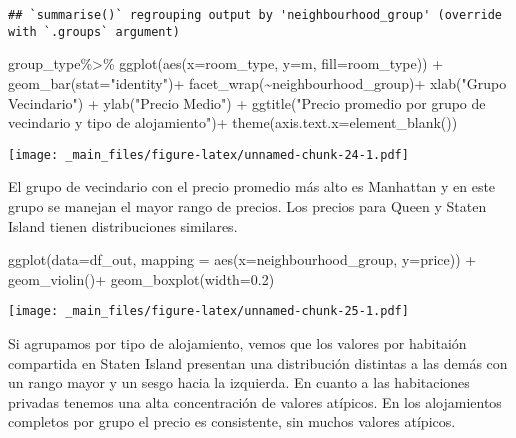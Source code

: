 \documentclass[
]{book}
\newenvironment{Shaded}{\begin{snugshade}}{\end{snugshade}}
\newcommand{\AttributeTok}[1]{\textcolor[rgb]{0.77,0.63,0.00}{#1}}
\newcommand{\FloatTok}[1]{\textcolor[rgb]{0.00,0.00,0.81}{#1}}
\newcommand{\FunctionTok}[1]{\textcolor[rgb]{0.00,0.00,0.00}{#1}}
\newcommand{\NormalTok}[1]{#1}
\newcommand{\SpecialCharTok}[1]{\textcolor[rgb]{0.00,0.00,0.00}{#1}}
\newcommand{\StringTok}[1]{\textcolor[rgb]{0.31,0.60,0.02}{#1}}
\begin{document}
\begin{verbatim}
## `summarise()` regrouping output by 'neighbourhood_group' (override with `.groups` argument)
\end{verbatim}

\begin{Shaded}
\begin{Highlighting}[]
\NormalTok{group\_type}\SpecialCharTok{\%\textgreater{}\%}
  \FunctionTok{ggplot}\NormalTok{(}\FunctionTok{aes}\NormalTok{(}\AttributeTok{x=}\NormalTok{room\_type, }\AttributeTok{y=}\NormalTok{m, }\AttributeTok{fill=}\NormalTok{room\_type)) }\SpecialCharTok{+} 
  \FunctionTok{geom\_bar}\NormalTok{(}\AttributeTok{stat=}\StringTok{"identity"}\NormalTok{)}\SpecialCharTok{+}
  \FunctionTok{facet\_wrap}\NormalTok{(}\SpecialCharTok{\textasciitilde{}}\NormalTok{neighbourhood\_group)}\SpecialCharTok{+}
  \FunctionTok{xlab}\NormalTok{(}\StringTok{"Grupo Vecindario"}\NormalTok{) }\SpecialCharTok{+} \FunctionTok{ylab}\NormalTok{(}\StringTok{"Precio Medio"}\NormalTok{) }\SpecialCharTok{+}
  \FunctionTok{ggtitle}\NormalTok{(}\StringTok{"Precio promedio por grupo de vecindario y tipo de alojamiento"}\NormalTok{)}\SpecialCharTok{+}
  \FunctionTok{theme}\NormalTok{(}\AttributeTok{axis.text.x=}\FunctionTok{element\_blank}\NormalTok{())}
\end{Highlighting}
\end{Shaded}

\texttt{[image: \_main\_files/figure-latex/unnamed-chunk-24-1.pdf]}

El grupo de vecindario con el precio promedio más alto es Manhattan y en este grupo se manejan el mayor rango de precios. Los precios para Queen y Staten Island tienen distribuciones similares.

\begin{Shaded}
\begin{Highlighting}[]
\FunctionTok{ggplot}\NormalTok{(}\AttributeTok{data=}\NormalTok{df\_out, }\AttributeTok{mapping =} \FunctionTok{aes}\NormalTok{(}\AttributeTok{x=}\NormalTok{neighbourhood\_group, }\AttributeTok{y=}\NormalTok{price)) }\SpecialCharTok{+}
  \FunctionTok{geom\_violin}\NormalTok{()}\SpecialCharTok{+}
  \FunctionTok{geom\_boxplot}\NormalTok{(}\AttributeTok{width=}\FloatTok{0.2}\NormalTok{)}
\end{Highlighting}
\end{Shaded}

\texttt{[image: \_main\_files/figure-latex/unnamed-chunk-25-1.pdf]}

Si agrupamos por tipo de alojamiento, vemos que los valores por habitaión compartida en Staten Island presentan una distribución distintas a las demás con un rango mayor y un sesgo hacia la izquierda. En cuanto a las habitaciones privadas tenemos una alta concentración de valores atípicos. En los alojamientos completos por grupo el precio es consistente, sin muchos valores atípicos.
\end{document}
